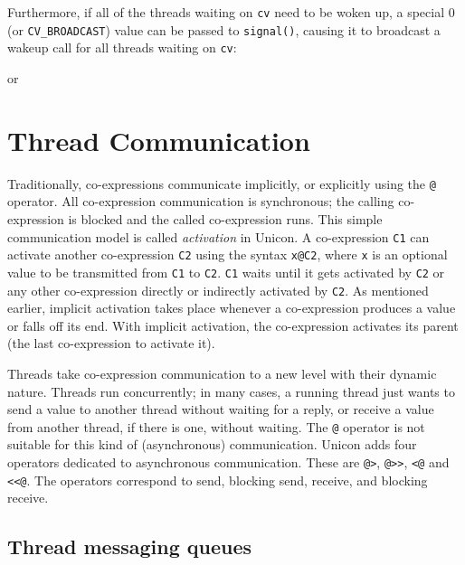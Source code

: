 Furthermore, if all of the threads waiting on \texttt{cv} need to be woken up, a
special 0 (or \texttt{CV\_BROADCAST}) value can be passed to \texttt{signal()},
causing it to broadcast a wakeup call for all threads waiting on \texttt{cv}:


or




\section{Thread Communication}

Traditionally, co-expressions communicate implicitly, or explicitly using the
\texttt{@} operator.  All co-expression communication is synchronous; the
calling co-expression is blocked and the called co-expression runs.  This simple
communication model is called \emph{activation} in Unicon.  A co-expression
\texttt{C1} can activate another co-expression \texttt{C2} using the syntax
\texttt{x@C2}, where \texttt{x} is an optional value to be transmitted from
\texttt{C1} to \texttt{C2}.  \texttt{C1} waits until it gets activated by
\texttt{C2} or any other co-expression directly or indirectly activated by
\texttt{C2}.  As mentioned earlier, implicit activation takes place whenever a
co-expression produces a value or falls off its end. With implicit activation,
the co-expression activates its parent (the last co-expression to activate it).

Threads take co-expression communication to a new level with their dynamic
nature. Threads run concurrently; in many cases, a running thread just wants to
send a value to another thread without waiting for a reply, or receive a value
from another thread, if there is one, without waiting.  The \texttt{@} operator
is not suitable for this kind of (asynchronous) communication.  Unicon adds four
operators dedicated to asynchronous communication. These are \texttt{@>},
\texttt{@>{}>}, \texttt{<@} and \texttt{<{}<@}. The operators correspond to send,
blocking send, receive, and blocking receive.

\subsection{Thread messaging queues}

